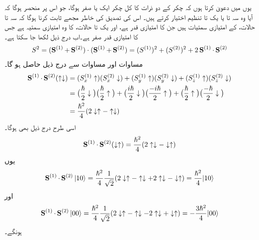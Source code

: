  یوں میں دعویٰ کرتا ہوں کہ  چکر کے دو ذرات کا کل چکر ایک  یا صفر  ہوگا، جو اس پر منحصر ہوگا کہ آیا وہ سہ تا یا یک تا تنظیم اختیار کرتے ہیں۔ اس کی تصدیق کی خاطر مجھے ثابت کرنا ہوگا کہ سہ تا حالات،  کے امتیازی سمتیات ہیں جن کا امتیازی قدر  ہے، اور یک تا حالات،  کا وہ امتیازی سمتیہ ہے جس کا امتیازی قدر صفر ہے۔اب درج ذیل لکھا جا سکتا ہے۔
\begin{align}\label{مساوات_تین_ابعادی_مربع_ایس_سادہ}
S^2 = (\operatorname{\mathbf{S}}^{(1)} + \operatorname{\mathbf{S}}^{(2)}) \cdot (\operatorname{\mathbf{S}}^{(1)} + \operatorname{\mathbf{S}}^{(2)}) = (S^{(1)})^2 + (S^{(2)})^2 + 2 \operatorname{\mathbf{S}}^{(1)} \cdot \operatorname{\mathbf{S}}^{(2)}
\end{align}
مساوات  اور مساوات  سے درج ذیل حاصل ہو گا۔
\begin{align*}
\operatorname{\mathbf{S}}^{(1)} \cdot \operatorname{\mathbf{S}}^{(2)} (\uparrow \downarrow) &= (S_x^{(1)} \uparrow) (S_x^{(2)} \downarrow) + (S_y^{(1)} \uparrow) (S_y^{(2)} \downarrow) + (S_z^{(1)} \uparrow) (S_z^{(2)} \downarrow) \\
&= \big ( \frac{\hslash}{2} \downarrow \big ) \big ( \frac{\hslash}{2} \uparrow \big ) + \big ( \frac{i \hslash}{2} \downarrow \big ) \big ( \frac{- i \hslash}{2} \uparrow \big ) + \big ( \frac{\hslash}{2} \uparrow \big ) \big ( \frac{- \hslash}{2} \downarrow \big ) \\
&= \frac{\hslash^2}{4} (2 \downarrow \uparrow - \uparrow \downarrow)
\end{align*}
اسی طرح درج ذیل بھی ہوگا۔
\begin{align*}
\operatorname{\mathbf{S}}^{(1)} \cdot \operatorname{\mathbf{S}}^{(2)} (\downarrow \uparrow) = \frac{\hslash^2}{4} (2 \uparrow \downarrow - \downarrow \uparrow)
\end{align*}
یوں
\begin{align}
\operatorname{\mathbf{S}}^{(1)} \cdot \operatorname{\mathbf{S}}^{(2)} | 1 0 \rangle = \frac{\hslash^2}{4} \frac{1}{\sqrt{2}} (2 \downarrow \uparrow - \uparrow \downarrow + 2 \uparrow \downarrow - \downarrow \uparrow) = \frac{\hslash^2}{4} | 1 0 \rangle
\end{align}
اور
\begin{align}
\operatorname{\mathbf{S}}^{(1)} \cdot \operatorname{\mathbf{S}}^{(2)} | 0 0 \rangle = \frac{\hslash^2}{4} \frac{1}{\sqrt{2}} (2 \downarrow \uparrow - \uparrow \downarrow - 2 \uparrow \downarrow + \downarrow \uparrow) = -\frac{3\hslash^2}{4} | 0 0 \rangle
\end{align}
ہونگے۔

